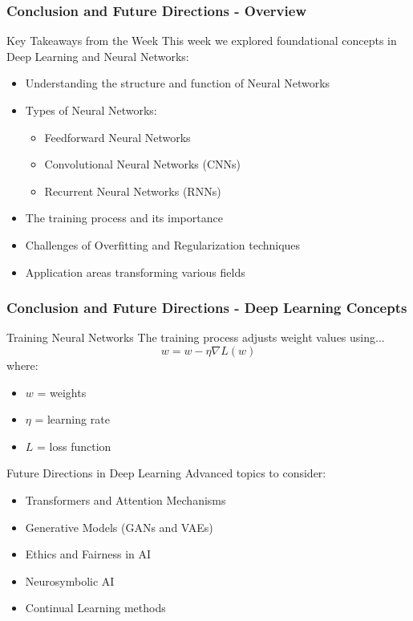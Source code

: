\documentclass[aspectratio=169]{beamer}
\begin{document}
\begin{frame}[fragile]
    \frametitle{Conclusion and Future Directions - Overview}
    \begin{block}{Key Takeaways from the Week}
        This week we explored foundational concepts in Deep Learning and Neural Networks:
    \end{block}
    \begin{itemize}
        \item Understanding the structure and function of Neural Networks
        \item Types of Neural Networks:
          \begin{itemize}
              \item Feedforward Neural Networks
              \item Convolutional Neural Networks (CNNs)
              \item Recurrent Neural Networks (RNNs)
          \end{itemize}
        \item The training process and its importance
        \item Challenges of Overfitting and Regularization techniques
        \item Application areas transforming various fields
    \end{itemize}
\end{frame}

\begin{frame}[fragile]
    \frametitle{Conclusion and Future Directions - Deep Learning Concepts}
    \begin{block}{Training Neural Networks}
        The training process adjusts weight values using...
        \begin{equation}
            w = w - \eta \nabla L(w)
        \end{equation}
        where:
        \begin{itemize}
            \item \( w \) = weights
            \item \( \eta \) = learning rate
            \item \( L \) = loss function
        \end{itemize}
    \end{block}
    
    \begin{block}{Future Directions in Deep Learning}
        Advanced topics to consider:
    \end{block}
    \begin{itemize}
        \item Transformers and Attention Mechanisms
        \item Generative Models (GANs and VAEs)
        \item Ethics and Fairness in AI
        \item Neurosymbolic AI
        \item Continual Learning methods
    \end{itemize}
\end{frame}
\end{document}
